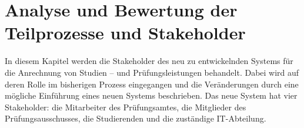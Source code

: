 \section{Analyse und Bewertung der Teilprozesse und Stakeholder}

In diesem Kapitel werden die Stakeholder des neu zu entwickelnden Systems für die Anrechnung von Studien – und Prüfungsleistungen behandelt. Dabei wird auf deren Rolle im bisherigen Prozess eingegangen und die Veränderungen durch eine mögliche Einführung eines neuen Systems beschrieben. Das neue System hat vier Stakeholder: die Mitarbeiter des Prüfungsamtes, die Mitglieder des Prüfungsausschusses, die Studierenden und die zuständige IT-Abteilung.

